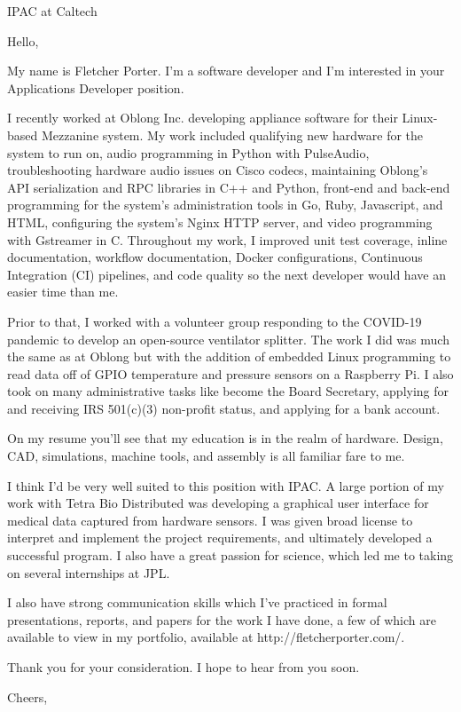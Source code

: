 \documentclass[12pt,american,german,british]{letter}
\begin{document}
\raggedright

\begin{letter}{IPAC at Caltech}

\opening{Hello,}

My name is Fletcher Porter.  I'm a software developer and I'm interested in
your Applications Developer position.

I recently worked at Oblong Inc. developing appliance software for their
Linux-based Mezzanine system.  My work included qualifying new hardware for the
system to run on, audio programming in Python with PulseAudio,
troubleshooting hardware audio issues on Cisco codecs, maintaining Oblong's API
serialization and RPC libraries in C++ and Python, front-end and back-end
programming for the system's administration tools in Go, Ruby, Javascript, and
HTML, configuring the system's Nginx HTTP server, and video programming with
Gstreamer in C.  Throughout my work, I improved unit test coverage, inline
documentation, workflow documentation, Docker configurations, Continuous
Integration (CI) pipelines, and code quality so the next developer would have
an easier time than me.

Prior to that, I worked with a volunteer group responding to the COVID-19
pandemic to develop an open-source ventilator splitter.  The work I did was
much the same as at Oblong but with the addition of embedded Linux programming
to read data off of GPIO temperature and pressure sensors on a Raspberry Pi.  I
also took on many administrative tasks like become the Board Secretary,
applying for and receiving IRS 501(c)(3) non-profit status, and applying for a
bank account.

On my resume you'll see that my education is in the realm of hardware.  Design, 
CAD, simulations, machine tools, and assembly is all familiar fare to me.

I think I'd be very well suited to this position with IPAC.  A large portion of
my work with Tetra Bio Distributed was developing a graphical user interface for
medical data captured from hardware sensors.  I was given broad license to
interpret and implement the project requirements, and ultimately developed a
successful program.  I also have a great passion for science, which led me to
taking on several internships at JPL.

I also have strong communication skills which I've practiced in formal
presentations, reports, and papers for the work I have done, a few of which are
available to view in my portfolio, available at http://fletcherporter.com/.

Thank you for your consideration.  I hope to hear from you soon.


\closing{Cheers,}

\end{letter}
\end{document}
